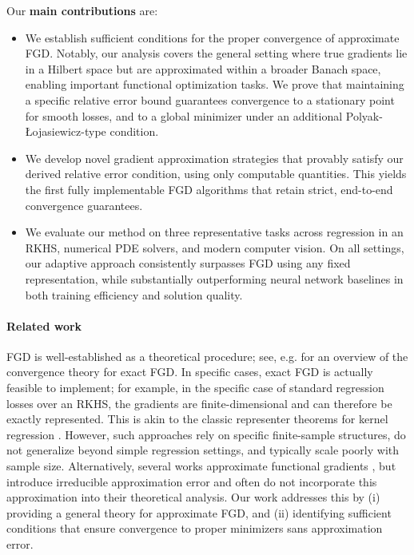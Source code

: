 \documentclass{article}
\begin{document}
Our \textbf{main contributions} are:

\begin{itemize}
    \item We establish sufficient conditions for the proper convergence of approximate FGD. Notably, our analysis covers the general setting where true gradients lie in a Hilbert space but are approximated within a broader Banach space, enabling important functional optimization tasks. We prove that maintaining a specific relative error bound guarantees convergence to a stationary point for smooth losses, and to a global minimizer under an additional Polyak-Łojasiewicz-type condition.
    \item We develop novel gradient approximation strategies that provably satisfy our derived relative error condition, using only computable quantities. This yields the first fully implementable FGD algorithms that retain strict, end-to-end convergence guarantees.
    \item We evaluate our method on three representative tasks across regression in an RKHS, numerical PDE solvers, and modern computer vision. On all settings, our adaptive approach consistently surpasses FGD using any fixed representation, while substantially outperforming neural network baselines in both training efficiency and solution quality.
\end{itemize}

\paragraph{Related work}
FGD is well-established as a theoretical procedure; see, e.g. \citep{book-opt-hilbert} for an overview of the convergence theory for exact FGD.
In specific cases, exact FGD is actually feasible to implement; for example, in the specific case of standard regression losses over an RKHS, the gradients are finite-dimensional and can therefore be exactly represented. This is akin to the classic representer theorems for kernel regression \citep{representer-theorems-wahba,representer-theorems-scholkopf}.
However, such approaches rely on specific finite-sample structures, do not generalize beyond simple regression settings, and typically scale poorly with sample size.
Alternatively, several works approximate functional gradients \citep{sip-functional,npiv,fgd-random-gradientfree,functional-bilevel,wasserstein-barycenter-fgd},
but introduce irreducible approximation error and often do not incorporate this approximation into their theoretical analysis.
Our work addresses this by (i) providing a general theory for approximate FGD, and (ii) identifying sufficient conditions that ensure convergence to proper minimizers sans approximation error.
\end{document}
